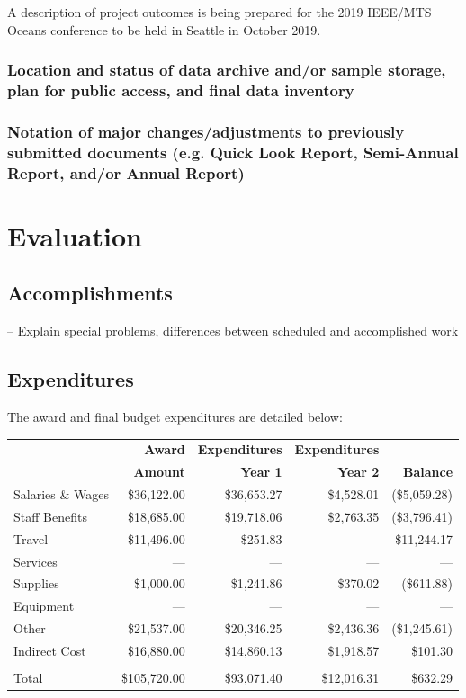 \documentclass[letterpaper,12pt]{article}
\begin{document}
A description of project outcomes is being prepared for the 2019 IEEE/MTS Oceans conference to be held in Seattle in October 2019.

\subsubsection*{Location and status of data archive and/or sample storage, plan for public access, and final data inventory} 



\subsubsection*{Notation of major changes/adjustments to previously submitted documents (e.g.    Quick Look Report, Semi-Annual Report, and/or Annual Report)}

\section{Evaluation}

\subsection{Accomplishments}

– Explain special problems, differences between scheduled and accomplished work

\subsection{Expenditures}

The award and final budget expenditures are detailed below:

\begin{tabularx}{0.9\textwidth}{X|rrrr}
    & \textbf{Award} & \textbf{Expenditures} & \textbf{Expenditures} &  \\
    & \textbf{Amount} & \textbf{Year 1} & \textbf{Year 2} & \textbf{Balance} \\
    \hline\hline
    Salaries \& Wages & \$36,122.00 & \$36,653.27 & \$4,528.01 & (\$5,059.28) \\
    Staff Benefits & \$18,685.00 & \$19,718.06 & \$2,763.35 & (\$3,796.41) \\
    Travel & \$11,496.00 & \$251.83 & --- & \$11,244.17 \\
    Services & --- & --- & --- & --- \\
    Supplies & \$1,000.00 & \$1,241.86 & \$370.02 & (\$611.88) \\
    Equipment & --- & --- & --- & --- \\
    Other & \$21,537.00 & \$20,346.25 & \$2,436.36 & (\$1,245.61) \\
    Indirect Cost & \$16,880.00 & \$14,860.13 & \$1,918.57 & \$101.30 \\
     \\
    Total & \$105,720.00 & \$93,071.40 & \$12,016.31 & \$632.29 
\end{tabularx}
\end{document}
